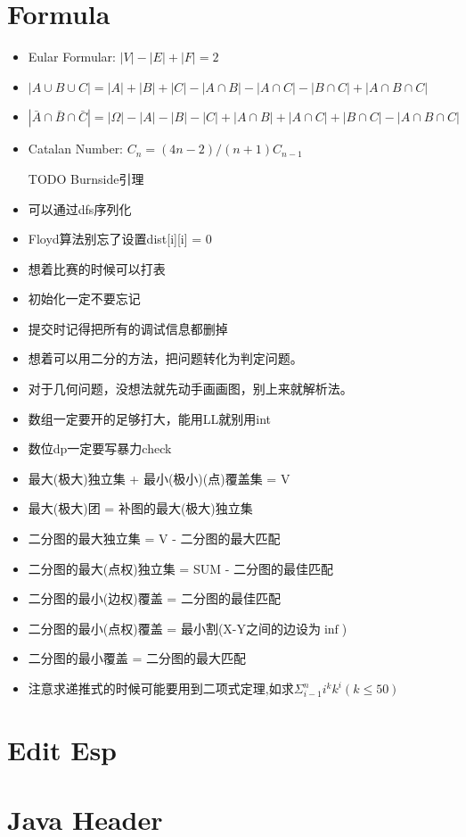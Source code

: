 \documentclass[
	10pt,
	twocolumn,
	a4paper,
]{article}
\begin{document}
\section{Formula}
\begin{itemize} 
\item Eular Formular: $|V| - |E| + |F| = 2$
\item $|A \cup B \cup C | = |A| + |B| + |C| - |A \cap B| - |A \cap C| - |B \cap C| + |A \cap B \cap C|$
\item $|\bar A \cap \bar B \cap \bar C | = |\Omega| - |A| - |B| - |C| + |A \cap B| + |A \cap C| + |B \cap C| - |A \cap B \cap C| $
\item Catalan Number: $C_n = (4n-2) / (n+1) C_{n-1}$
\item [TODO]Burnside引理
\item 可以通过dfs序列化
\item Floyd算法别忘了设置dist[i][i] = 0
\item 想着比赛的时候可以打表
\item 初始化一定不要忘记
\item 提交时记得把所有的调试信息都删掉
\item 想着可以用二分的方法，把问题转化为判定问题。
\item 对于几何问题，没想法就先动手画画图，别上来就解析法。
\item 数组一定要开的足够打大，能用LL就别用int
\item 数位dp一定要写暴力check
\item 最大(极大)独立集 + 最小(极小)(点)覆盖集 = V
\item 最大(极大)团 = 补图的最大(极大)独立集
\item 二分图的最大独立集 = V - 二分图的最大匹配
\item 二分图的最大(点权)独立集 = SUM - 二分图的最佳匹配
\item 二分图的最小(边权)覆盖 = 二分图的最佳匹配
\item 二分图的最小(点权)覆盖 = 最小割(X-Y之间的边设为$\inf$)
\item 二分图的最小覆盖 = 二分图的最大匹配
\item 注意求递推式的时候可能要用到二项式定理,如求$ \Sigma_{i-1}^n{i^k k^i} (k \le 50) $
\end{itemize} 

\section{Edit Esp}

\section{Java Header}

\end{document}
